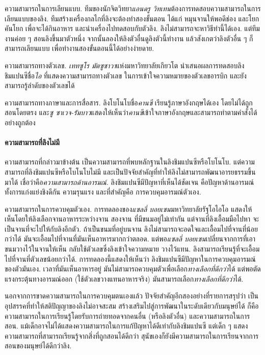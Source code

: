{\begin{shaded}
		ความสามารถในการเลียนแบบ.
		ทีมของนักจิตวิทยา\textit{แอนดรู วิทเทน}ต้องการทดสอบความสามารถในการเลียนแบบของลิง.
		ทีมสร้างเครื่องกลไกที่ลิงจะต้องทำสองขั้นตอน ได้แก่ หมุนจานให้พอดีช่อง และโยกคันโยก เพื่อจะได้กินอาหาร
		และนำเครื่องไปทดสอบกับตัวลิง.
		ลิงไม่สามารถจะหาวิธีทำนี้ได้เอง.
		แต่ทีมงานค่อย ๆ สอนลิงขึ้นมาตัวหนึ่ง
		จากนั้นลองให้ลิงตัวอื่นดูลิงตัวนี้ทำงาน
		แล้วสังเกตว่าลิงตัวอื่น ๆ ก็สามารถเลียนแบบ เพื่อทำงานสองขั้นตอนนี้ได้อย่างง่ายดาย.
		
		ความสามารถทางตัวเลข.
		\textit{เททซูโร มัตซูซาวา}แห่งมหาวิทยาลัยเกียวโต นำเสนอผลการทดสอบลิงชิมแปนซีชื่อ\textit{ไอ} ที่แสดงความสามารถทางตัวเลข ในการเข้าใจความหมายของตัวเลขอารบิก และยังสามารถรู้ลำดับของตัวเลขได้
		
		ความสามารถทางภาษาและการสื่อสาร.
		ลิงโบโนโบชื่อ\textit{คานซี} เรียนรู้ภาษาอังกฤษได้เอง โดยไม่ได้ถูกสอนโดยตรง
		และ\textit{ซู ซาเวจ-รัมบาว}แสดงให้เห็นว่า\textit{คานซี}เข้าใจภาษาอังกฤษและสามารถทำตามคำสั่งได้อย่างถูกต้อง
		
		\paragraph{\small ความสามารถที่ลิงไม่มี} 
		ความสามารถที่กล่าวมาข้างต้น เป็นความสามารถที่พบหลักฐานในลิงชิมแปนซีหรือโบโนโบ.
		แต่ความสามารถที่ลิงชิมแปนซีหรือโบโนโบไม่มี
		และเป็นปัจจัยสำคัญที่ทำให้ลิงไม่สามารถพัฒนาอารยธรรมขึ้นมาได้
		เชื่อว่าคือ\textit{ความสามารถด้านอารมณ์}.
		ลิงชิมแปนซีมีปัญหาที่เห็นได้ชัดเจน คือปัญหาด้านอารมณ์ ทั้งการแก่งแย่งชิงดีกัน ความรุนแรง และที่สำคัญคือ การควบคุมอารมณ์ตัวเอง.
		
		ความสามารถในการควบคุมตัวเอง.
		การทดลองของ\textit{แซลลี่ บอยเซน}มหาวิทยาลัยรัฐโอไอโอ
		แสดงให้เห็นโดยให้ลิงเลือกจานอาหารระหว่างจาน สองจาน ที่มีขนมอยู่ไม่เท่ากัน
		แต่จานที่ลิงเอื้อมมือไปหา จะเป็นจานที่จะไปให้กับลิงอีกตัว.
		ถ้าเป็นขนมที่อยู่บนจาน ลิงไม่สามารถจะอดใจและเอื้อมไปที่จานที่น้อยกว่าได้
		มันจะเอื้อมไปที่จานที่มันเห็นอาหารมากกว่าตลอด.
		แต่พอ\textit{แซลลี่ บอยเซน}เปลี่ยนจากการที่เอาขนมวางไว้ในจานให้เห็น
		กลับใช้ตัวเลขซึ่งลิงเข้าใจความหมาย วางไว้แทน.
		ลิงสามารถเรียนรู้ที่จะเอื้อมไปที่จานที่ตัวเลขน้อยกว่าได้.
		การทดลองนี้แสดงให้เห็นว่า ลิงชิมแปนซีมีปัญหาในการควบคุมอารมณ์ของตัวมันเอง.
		เวลาที่มันเห็นอาหารอยู่ มันไม่สามารถควบคุมตัวเพื่อเลือก\textit{ทางเลือกที่ดีกว่า}ได้
		แต่พอตัดแรงกระตุ้นทางอารมณ์ออก (ใช้ตัวเลขวางแทนอาหารจริง) มันสามารถเลือก\textit{ทางเลือกที่ดีกว่า}ได้.
		
		นอกจากการขาดความสามารถในการควบคุมตนเองแล้ว
		ปัจจัยสำคัญอีกสองอย่างที่รายการสรุปว่า เป็นอุปสรรคที่ทำให้สติปัญญาของลิงไม่อาจสะสม สร้างเสริมไปสู่การพัฒนาในระดับเดียวกับมนุษย์ได้ ก็คือ
		ความสามารถในการเรียนรู้โดยรับการถ่ายทอดจากคนอื่น (หรือลิงตัวอื่น)
		และความสามารถในการสอน.
		แม้เด็กอาจไม่ได้แสดงความสามารถในการแก้ปัญหาได้ดีเท่ากับลิงชิมแปนซี
		แต่เด็ก ๆ แสดงความสามารถที่สามารถเรียนรู้จากสิ่งที่ถูกสอนได้ดีกว่า
		สุนัขเองก็ยังมีความสามารถในการเรียนจากการสอนของมนุษย์ได้ดีกว่าลิง.
		

\end{shaded}}
